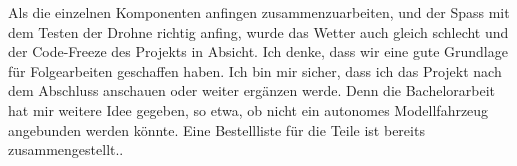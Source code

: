 Als die einzelnen Komponenten anfingen zusammenzuarbeiten, und der Spass mit dem Testen der Drohne richtig anfing, wurde das Wetter auch gleich schlecht und der Code-Freeze des Projekts in Absicht. 
Ich denke, dass wir eine gute Grundlage für Folgearbeiten geschaffen haben.
Ich bin mir sicher, dass ich das Projekt nach dem Abschluss anschauen oder weiter ergänzen werde.
Denn die Bachelorarbeit hat mir weitere Idee gegeben, so etwa, ob nicht ein autonomes Modellfahrzeug angebunden werden könnte. Eine Bestellliste für die Teile ist bereits zusammengestellt..




